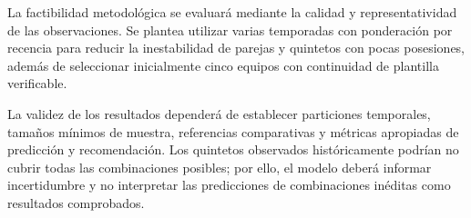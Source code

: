 La factibilidad metodológica se evaluará mediante la calidad y representatividad de las observaciones. Se plantea utilizar varias temporadas con ponderación por recencia para reducir la inestabilidad de parejas y quintetos con pocas posesiones, además de seleccionar inicialmente cinco equipos con continuidad de plantilla verificable.

La validez de los resultados dependerá de establecer particiones temporales, tamaños mínimos de muestra, referencias comparativas y métricas apropiadas de predicción y recomendación. Los quintetos observados históricamente podrían no cubrir todas las combinaciones posibles; por ello, el modelo deberá informar incertidumbre y no interpretar las predicciones de combinaciones inéditas como resultados comprobados.